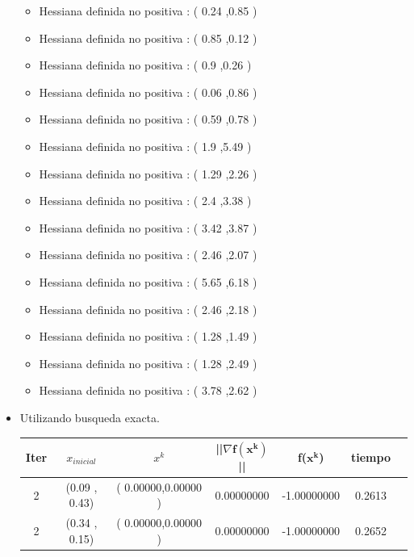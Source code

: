\begin{itemize}
\begin{itemize}
\item  Hessiana definida no positiva : ( 0.24 ,0.85 )
\item  Hessiana definida no positiva : ( 0.85 ,0.12 )
\item  Hessiana definida no positiva : ( 0.9 ,0.26 )
\item  Hessiana definida no positiva : ( 0.06 ,0.86 )
\item  Hessiana definida no positiva : ( 0.59 ,0.78 )
\item  Hessiana definida no positiva : ( 1.9 ,5.49 )
\item  Hessiana definida no positiva : ( 1.29 ,2.26 )
\item  Hessiana definida no positiva : ( 2.4 ,3.38 )
\item  Hessiana definida no positiva : ( 3.42 ,3.87 )
\item  Hessiana definida no positiva : ( 2.46 ,2.07 )
\item  Hessiana definida no positiva : ( 5.65 ,6.18 )
\item  Hessiana definida no positiva : ( 2.46 ,2.18 )
\item  Hessiana definida no positiva : ( 1.28 ,1.49 )
\item  Hessiana definida no positiva : ( 1.28 ,2.49 )
\item  Hessiana definida no positiva : ( 3.78 ,2.62 )
\end{itemize}









\item Utilizando busqueda exacta.

\begin{table}[H]
\centering
\renewcommand{\arraystretch}{1.2} 
\begin{tabular}{|c|c|c|c|c|c|c|}
\hline
\textbf{Iter} & \textbf{$x_{inicial}$} &\textbf{$x^k$} & \textbf{||$\nabla \mathbf{f(x^k)}$}|| & \textbf{f($\mathbf{x^k}$)} & \textbf{tiempo} \\
\hline
2  &  (0.09 , 0.43) &( 0.00000,0.00000 ) & 0.00000000 & -1.00000000 & 0.2613 \\
2  &  (0.34 , 0.15) &( 0.00000,0.00000 ) & 0.00000000 & -1.00000000 & 0.2652 \\
\hline
\end{tabular}
\end{table}



\end{itemize}
